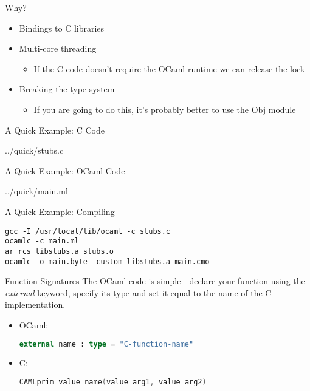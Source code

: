\documentclass{beamer}
\begin{document}
\begin{frame}{Why?}
\begin{itemize}
    \item Bindings to C libraries
    \item Multi-core threading
    \begin{itemize}
        \item If the C code doesn't require the OCaml runtime we can release the lock
    \end{itemize}
    \item Breaking the type system
    \begin{itemize}
        \item If you are going to do this, it's probably better to use the Obj module
    \end{itemize}
\end{itemize}
\end{frame}

\begin{frame}[fragile]{A Quick Example: C Code}
\begin{lstinputlisting}[language=C]{../quick/stubs.c}
\end{lstinputlisting}
\end{frame}

\begin{frame}[fragile]{A Quick Example: OCaml Code}
\begin{lstinputlisting}[language=ML]{../quick/main.ml}
\end{lstinputlisting}
\end{frame}

\begin{frame}[fragile]{A Quick Example: Compiling}
\begin{lstlisting}
gcc -I /usr/local/lib/ocaml -c stubs.c
ocamlc -c main.ml
ar rcs libstubs.a stubs.o
ocamlc -o main.byte -custom libstubs.a main.cmo
\end{lstlisting}
\end{frame}

\begin{frame}[fragile]{Function Signatures}
The OCaml code is simple - declare your function using the \emph{external} keyword,
 specify its type and set it equal to the name of the C implementation.
\begin{itemize}
    \item OCaml:
    \begin{lstlisting}[language=ML]
    external name : type = "C-function-name"
    \end{lstlisting}
    \item C:
    \begin{lstlisting}[language=C]
    CAMLprim value name(value arg1, value arg2)
    \end{lstlisting}
\end{itemize}
\end{frame}
\end{document}
